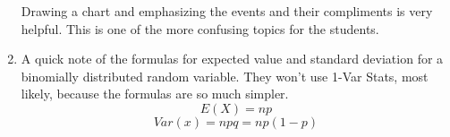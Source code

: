 \documentclass{article}
\begin{document}
\begin{enumerate}
   Drawing a chart and emphasizing the events and their compliments is very helpful. This is one of the more confusing topics for the students.
   
  \item A quick note of the formulas for expected value and standard deviation for a binomially distributed random variable. They won’t use 1-Var Stats, most likely, because the formulas are so much simpler.
  $$E(X) = np$$
  $$Var(x) = npq=np(1-p)$$
  
\end{enumerate}
\end{document}

